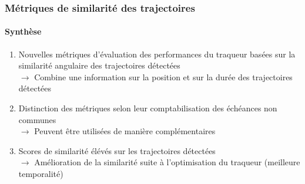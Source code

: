 \documentclass[aspectratio=169, usepdftitle=false, xcolor={dvipsnames}, 9pt,table]{beamer}
\begin{document}
\begin{frame}
    \frametitle{Métriques de similarité des trajectoires}
    \framesubtitle{Synthèse}
    \begin{block}
        \small
        \begin{enumerate}
            \setlength\itemsep{1em}
            \item<1-> Nouvelles métriques d'évaluation des performances du traqueur basées sur la similarité angulaire des trajectoires détectées\\
                $\longrightarrow$ Combine une information sur la position et sur la durée des trajectoires détectées
            \item<2-> Distinction des métriques selon leur comptabilisation des échéances non communes\\
                $\longrightarrow$ Peuvent être utilisées de manière complémentaires
            \item<3-> Scores de similarité élévés sur les trajectoires détectées\\
                $\longrightarrow$ Amélioration de la similarité suite à l'optimisation du traqueur (meilleure temporalité)
        \end{enumerate}
    \end{block}
\end{frame}

 
\end{document}
